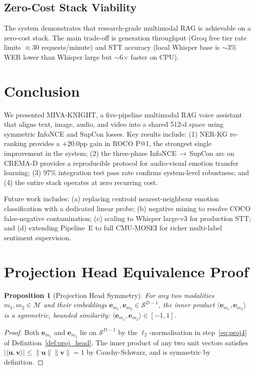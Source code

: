 \documentclass[10pt,conference]{IEEEtran}
\theoremstyle{ieeethm}
\newtheorem{proposition}[theorem]{Proposition}
\theoremstyle{ieeedef}
\theoremstyle{ieeeremark}
\begin{document}
\subsection{Zero-Cost Stack Viability}

The system demonstrates that research-grade multimodal RAG is achievable on a zero-cost stack. The main trade-off is generation throughput (Groq free tier rate limits $\approx$30 requests/minute) and STT accuracy (local Whisper base is $\sim$3\% WER lower than Whisper large but $\sim$6$\times$ faster on CPU).

\section{Conclusion}
\label{sec:conclusion}

We presented MIVA-KNIGHT, a five-pipeline multimodal RAG voice assistant that aligns text, image, audio, and video into a shared 512-d space using symmetric InfoNCE and SupCon losses. Key results include: (1) NER-KG re-ranking provides a $+20.0$pp gain in ROCO P@1, the strongest single improvement in the system; (2) the three-phase InfoNCE\,$\to$\,SupCon arc on CREMA-D provides a reproducible protocol for audio-visual emotion transfer learning; (3) 97\% integration test pass rate confirms system-level robustness; and (4) the entire stack operates at zero recurring cost.

Future work includes: (a) replacing centroid nearest-neighbour emotion classification with a dedicated linear probe; (b) negative mining to resolve COCO false-negative contamination; (c) scaling to Whisper large-v3 for production STT; and (d) extending Pipeline~E to full CMU-MOSEI for richer multi-label sentiment supervision.

\appendix
\section{Projection Head Equivalence Proof}
\label{app:proj_equiv}

\begin{proposition}[Projection Head Symmetry]
\label{prop:symmetry}
For any two modalities $m_1, m_2 \in \mathcal{M}$ and their embeddings $\mathbf{e}_{m_1}, \mathbf{e}_{m_2} \in \mathcal{S}^{D-1}$, the inner product $\langle\mathbf{e}_{m_1}, \mathbf{e}_{m_2}\rangle$ is a symmetric, bounded similarity: $\langle\mathbf{e}_{m_1}, \mathbf{e}_{m_2}\rangle \in [-1,1]$.
\end{proposition}
\begin{proof}
Both $\mathbf{e}_{m_1}$ and $\mathbf{e}_{m_2}$ lie on $\mathcal{S}^{D-1}$ by the $\ell_2$-normalisation in step~\eqref{eq:proj4} of Definition~\ref{def:proj_head}. The inner product of any two unit vectors satisfies $|\langle\mathbf{u},\mathbf{v}\rangle| \leq \|\mathbf{u}\|\|\mathbf{v}\| = 1$ by Cauchy-Schwarz, and is symmetric by definition.
\end{proof}
\end{document}
